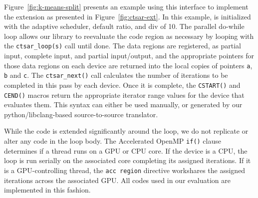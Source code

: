 Figure~\ref{fig:k-means-split} presents an example using this interface to
implement the extension as presented in Figure~\ref{fig:ctsar-ext}. In this
example, \tsar is initialized with the adaptive scheduler, default ratio, and
div of 10. The parallel do-while loop allows our library to reevaluate the
code region as necessary by looping with the \verb#ctsar_loop(s)# call until
done. The data regions are registered, as partial input, complete input, and
partial input/output, and the appropriate pointers for those data regions on
each device are returned into the local copies of pointers \verb#a#, \verb#b#
and \verb#c#. The \verb#ctsar_next()# call calculates the number of iterations
to be completed in this pass by each device. Once it is complete, the
\verb#CSTART()# and \verb#CEND()# macros return the appropriate iterator range
values for the device that evaluates them.  This syntax can either be used
manually, or generated by our python/libclang-based source-to-source
translator.

While the code is extended significantly around the loop, we do not replicate
or alter any code in the loop body. The Accelerated OpenMP \verb#if()# clause
determines if a thread runs on a GPU or CPU core. If the device is a CPU, the
loop is run serially on the associated core completing its assigned
iterations. If it is a GPU-controlling thread, the \verb#acc region# directive
workshares the assigned iterations across the associated GPU.  All codes used
in our evaluation are implemented in this fashion.




